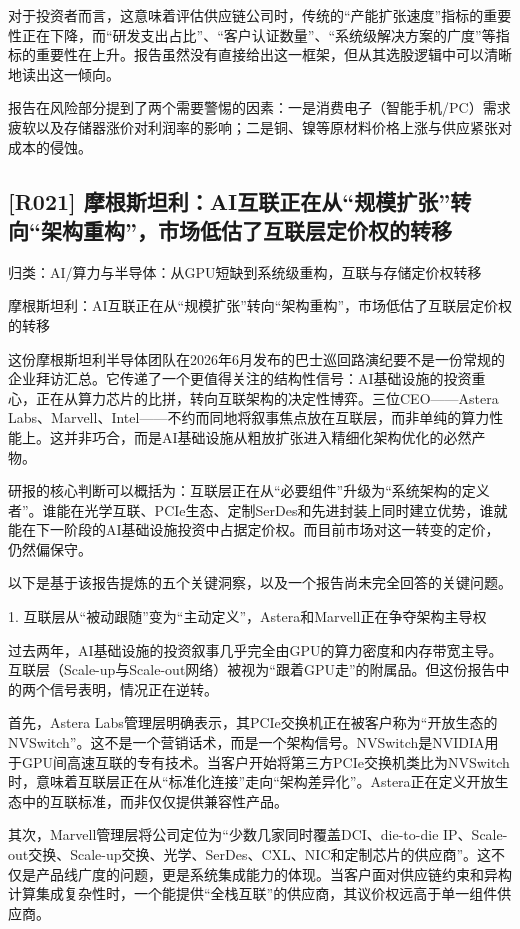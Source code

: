 \documentclass[11pt]{ctexart}
\begin{document}
对于投资者而言，这意味着评估供应链公司时，传统的“产能扩张速度”指标的重要性正在下降，而“研发支出占比”、“客户认证数量”、“系统级解决方案的广度”等指标的重要性在上升。报告虽然没有直接给出这一框架，但从其选股逻辑中可以清晰地读出这一倾向。

报告在风险部分提到了两个需要警惕的因素：一是消费电子（智能手机/PC）需求疲软以及存储器涨价对利润率的影响；二是铜、镍等原材料价格上涨与供应紧张对成本的侵蚀。

\subsection{[R021] 摩根斯坦利：AI互联正在从“规模扩张”转向“架构重构”，市场低估了互联层定价权的转移}
{\small\color{refgray}归类：AI/算力与半导体：从GPU短缺到系统级重构，互联与存储定价权转移}

摩根斯坦利：AI互联正在从“规模扩张”转向“架构重构”，市场低估了互联层定价权的转移

这份摩根斯坦利半导体团队在2026年6月发布的巴士巡回路演纪要不是一份常规的企业拜访汇总。它传递了一个更值得关注的结构性信号：AI基础设施的投资重心，正在从算力芯片的比拼，转向互联架构的决定性博弈。三位CEO——Astera Labs、Marvell、Intel——不约而同地将叙事焦点放在互联层，而非单纯的算力性能上。这并非巧合，而是AI基础设施从粗放扩张进入精细化架构优化的必然产物。

研报的核心判断可以概括为：互联层正在从“必要组件”升级为“系统架构的定义者”。谁能在光学互联、PCIe生态、定制SerDes和先进封装上同时建立优势，谁就能在下一阶段的AI基础设施投资中占据定价权。而目前市场对这一转变的定价，仍然偏保守。

以下是基于该报告提炼的五个关键洞察，以及一个报告尚未完全回答的关键问题。

1. 互联层从“被动跟随”变为“主动定义”，Astera和Marvell正在争夺架构主导权

过去两年，AI基础设施的投资叙事几乎完全由GPU的算力密度和内存带宽主导。互联层（Scale-up与Scale-out网络）被视为“跟着GPU走”的附属品。但这份报告中的两个信号表明，情况正在逆转。

首先，Astera Labs管理层明确表示，其PCIe交换机正在被客户称为“开放生态的NVSwitch”。这不是一个营销话术，而是一个架构信号。NVSwitch是NVIDIA用于GPU间高速互联的专有技术。当客户开始将第三方PCIe交换机类比为NVSwitch时，意味着互联层正在从“标准化连接”走向“架构差异化”。Astera正在定义开放生态中的互联标准，而非仅仅提供兼容性产品。

其次，Marvell管理层将公司定位为“少数几家同时覆盖DCI、die-to-die IP、Scale-out交换、Scale-up交换、光学、SerDes、CXL、NIC和定制芯片的供应商”。这不仅是产品线广度的问题，更是系统集成能力的体现。当客户面对供应链约束和异构计算集成复杂性时，一个能提供“全栈互联”的供应商，其议价权远高于单一组件供应商。
\end{document}
